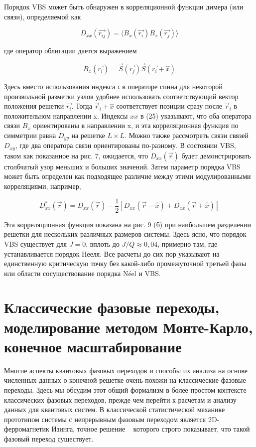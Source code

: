 \documentclass[11pt]{article}
\begin{document}
Порядок VBS может быть обнаружен в корреляционной функции димера (или связи), определяемой как

\begin{equation}
D_{xx}(\vec{r_{ij}}) = \langle B_x(\vec{r_i})  B_x(\vec{r_j}) \rangle
\label{eq_25}
\end{equation}

где оператор облигации дается выражением

\begin{equation}
B_x(\vec{r_i}) = \vec{S}(\vec{r_j}) \vec{S}(\vec{r_i} + \hat{x})
\label{eq_26}
\end{equation}

Здесь вместо использования индекса $i$ в операторе спина для некоторой произвольной разметки узлов удобнее использовать соответствующий вектор положения решетки $\vec{r_i}$. Тогда $\vec{r}_i + \hat{x}$ соответствует позиции сразу после $\vec{r}_i$ в положительном направлении x. Индексы $xx$ в (25) указывают, что оба оператора связи $B_x$ ориентированы в направлении x, и эта корреляционная функция по симметрии равна $D_{yy}$ на решетке $L × L$. Можно также рассмотреть связи связей $D_{xy}$, где два оператора связи ориентированы по-разному. В состоянии VBS, таком как показанное на рис. 7, ожидается, что $D_{xx}(\vec{r})$ будет демонстрировать столбчатый узор меньших и больших значений. Затем параметр порядка VBS может быть определен как подходящее различие между этими модулированными корреляциями, например,

\begin{equation}
D_{xx}^{*}(\vec{r}) = D_{xx}(\vec{r})-\frac{1}{2}[D_{xx}(\vec{r} - \hat{x}) + D_{xx}(\vec{r}+\hat{x})]
\label{eq_27}
\end{equation}

Эта корреляционная функция показана на рис. 9 (б) при наибольшем разделении решетки для нескольких различных размеров системы. Здесь ясно, что порядок VBS существует для $J = 0$, вплоть до $J / Q \approx 0,04$, примерно там, где устанавливается порядок Нееля. Все расчеты до сих пор указывают на единственную критическую точку без какой-либо промежуточной третьей фазы или области
сосуществование порядка Néel и VBS.

\section{Классические фазовые переходы, моделирование методом Монте-Карло, конечное масштабирование}
Многие аспекты квантовых фазовых переходов и способы их анализа на основе численных данных о конечной решетке очень похожи на классические фазовые переходы. Здесь мы обсудим этот общий формализм в более простом контексте классических фазовых переходов, прежде чем перейти к расчетам и анализу данных для квантовых систем.
В классической статистической механике прототипом системы с непрерывным фазовым переходом является 2D-ферромагнетик Изинга, точное решение ~\cite{pr_65_117,Baxter} которого строго показывает, что такой фазовый переход существует. 
\end{document}

